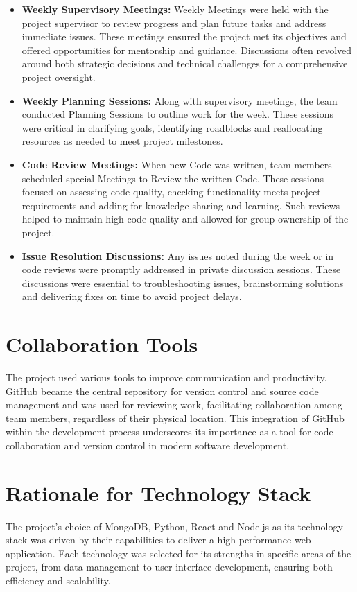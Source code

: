 \begin{itemize}
    \item \textbf{Weekly Supervisory Meetings:} Weekly Meetings were held with the project supervisor to review progress and plan future tasks and address immediate issues. These meetings ensured the project met its objectives and offered opportunities for mentorship and guidance. Discussions often revolved around both strategic decisions and technical challenges for a comprehensive project oversight.

    \item \textbf{Weekly Planning Sessions:} Along with supervisory meetings, the team conducted Planning Sessions to outline work for the week. These sessions were critical in clarifying goals, identifying roadblocks and reallocating resources as needed to meet project milestones.

    \item \textbf{Code Review Meetings:} When new Code was written, team members scheduled special Meetings to Review the written Code. These sessions focused on assessing code quality, checking functionality meets project requirements and adding for knowledge sharing and learning. Such reviews helped to maintain high code quality and allowed for group ownership of the project.

    \item \textbf{Issue Resolution Discussions:} Any issues noted during the week or in code reviews were promptly addressed in private discussion sessions. These discussions were essential to troubleshooting issues, brainstorming solutions and delivering fixes on time to avoid project delays.
    
\end{itemize}


\section{Collaboration Tools}
The project used various tools to improve communication and productivity. GitHub\cite{github2024} became the central repository for version control and source code management and was used for reviewing work, facilitating collaboration among team members, regardless of their physical location. This integration of GitHub within the development process underscores its importance as a tool for code collaboration and version control in modern software development.

\section{Rationale for Technology Stack}
The project's choice of MongoDB, Python, React and Node.js as its technology stack was driven by their capabilities to deliver a high-performance web application. Each technology was selected for its strengths in specific areas of the project, from data management to user interface development, ensuring both efficiency and scalability.



